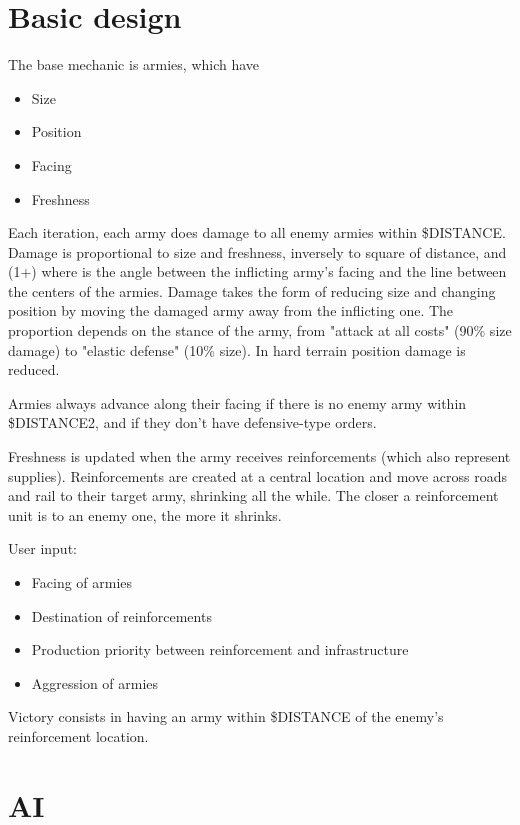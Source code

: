 \section{Basic design}

The base mechanic is armies, which have
\begin{itemize}
\item Size
\item Position
\item Facing
\item Freshness
\end{itemize}

Each iteration, each army does damage to all enemy armies
within \$DISTANCE. Damage is proportional to size and freshness,
inversely to square of distance, and (1+\cos\theta) where \theta
is the angle between the inflicting army's facing and the line between
the centers of the armies. Damage takes the form of reducing size
and changing position by moving the damaged army away from the inflicting one. 
The proportion depends on the stance of the army, from
"attack at all costs" (90\% size damage) to "elastic defense" (10\% size). 
In hard terrain position damage is reduced. 

Armies always advance along their facing if there is no enemy army within
\$DISTANCE2, and if they don't have defensive-type orders. 

Freshness is updated when the army receives reinforcements (which also represent
supplies). Reinforcements are created at a central location and move across 
roads and rail to their target army, shrinking all the while. The closer a reinforcement
unit is to an enemy one, the more it shrinks. 

User input:
\begin{itemize}
\item Facing of armies
\item Destination of reinforcements
\item Production priority between reinforcement and infrastructure
\item Aggression of armies
\end{itemize}

Victory consists in having an army within \$DISTANCE of the enemy's 
reinforcement location. 

\section{AI}





